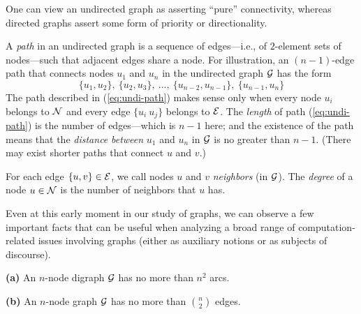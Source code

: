 One can view an undirected graph as asserting ``pure'' connectivity,
whereas directed graphs assert some form of priority or directionality.

A {\it path} in an undirected graph   is a sequence of
edges---i.e., of $2$-element sets of nodes---such that adjacent edges
share a node.  For illustration, an $(n-1)$-edge path that connects
nodes $u_1$ and $u_n$ in the undirected graph $\mbox{$\cal G$}$ has the form
\begin{equation}
\label{eq:undi-path}
\{u_1, u_2\}, \ \{u_2, u_3\}, \ \ldots, \ \{u_{n-2}, u_{n-1}\}, \ \{u_{n-1}, u_{n}\}
\end{equation}
The path described in (\ref{eq:undi-path}) makes sense only when every
node $u_i$ belongs to $\mbox{$\cal N$}$ and every edge $\{u_i \ u_j\}$ belongs
to $\mbox{$\cal E$}$.  The {\it length} of path (\ref{eq:undi-path}) is the
number of edges---which is $n-1$ here; and the existence of
the path means that the {\it distance}  
{\it between} $u_1$ and $u_n$ in $\mbox{$\cal G$}$ is no greater than $n-1$.  (There
may exist shorter paths that connect $u$ and $v$.)
\medskip

For each edge $\{u,v\} \in \mbox{$\cal E$}$, we call nodes $u$ and $v$ {\it neighbors} (in $\mbox{$\cal G$}$).
The {\it degree}
of a node $u \in \mbox{$\cal N$}$ is the number of neighbors that $u$ has.

Even at this early moment in our study of graphs, we can observe a few
important facts that can be useful when analyzing a broad range of
computation-related issues involving graphs (either as auxiliary
notions or as subjects of discourse).

\begin{prop}
\label{thm:number-edges/arcs}
{\bf (a)}
An $n$-node digraph $\mbox{$\cal G$}$ has no more than $n^2$ arcs.

{\bf (b)}
An $n$-node graph $\mbox{$\cal G$}$ has no more than $\displaystyle {n \choose 2}$ edges.

\end{prop}

